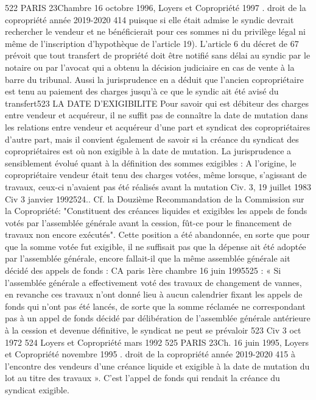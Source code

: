 522 PARIS 23\degres Chambre 16 octobre 1996, Loyers et Copropriété 1997 .
droit de la copropriété année 2019-2020
414
puisque si elle était admise le syndic devrait rechercher le vendeur et ne bénéficierait pour ces sommes ni du privilège légal ni même de l’inscription d’hypothèque de l’article 19).
L'article 6 du décret de 67 prévoit que tout transfert de propriété doit être notifié sans délai au syndic par le notaire ou par l'avocat qui a obtenu la décision judiciaire en cas de vente à la barre du tribunal.
Aussi la jurisprudence en a déduit que l'ancien copropriétaire est tenu au paiement des charges jusqu'à ce que le syndic ait été avisé du transfert523
LA DATE D’EXIGIBILITE
Pour savoir qui est débiteur des charges entre vendeur et acquéreur, il ne suffit pas de connaître la date de mutation dans les relations entre vendeur et acquéreur d’une part et syndicat des copropriétaires d’autre part, mais il convient également de savoir si la créance du syndicat des copropriétaires est où non exigible à la date de mutation.
La jurisprudence a sensiblement évolué quant à la définition des sommes exigibles :
A l’origine, le copropriétaire vendeur était tenu des charges votées, même lorsque, s’agissant de travaux, ceux-ci n’avaient pas été réalisés avant la mutation Civ. 3\degres, 19 juillet 1983 Civ 3 janvier 1992524..
Cf. la Douzième Recommandation de la Commission sur la Copropriété:
"Constituent des créances liquides et exigibles les appels de fonds votés par l'assemblée générale avant la cession, fût-ce pour le financement de travaux non encore exécutés".
Cette position a été abandonnée, en sorte que pour que la somme votée fut exigible, il ne suffisait pas que la dépense ait été adoptée par l'assemblée générale, encore fallait-il que la même assemblée générale ait décidé des appels de fonds :
CA paris 1ère chambre 16 juin 1995525 :
« Si l’assemblée générale a effectivement voté des travaux de changement de vannes, en revanche ces travaux n’ont donné lieu à aucun calendrier fixant les appels de fonds qui n’ont pas été lancés, de sorte que la somme réclamée ne correspondant pas à un appel de fonds décidé par délibération de l’assemblée générale antérieure à la cession et devenue définitive, le syndicat ne peut se prévaloir
523 Civ 3 oct 1972
524 Loyers et Copropriété mars 1992 
525 PARIS 23\degres Ch. 16 juin 1995, Loyers et Copropriété novembre 1995 .
droit de la copropriété année 2019-2020
415
à l’encontre des vendeurs d’une créance liquide et exigible à la date de mutation du lot au titre des travaux ».
C’est l’appel de fonds qui rendait la créance du syndicat exigible.

